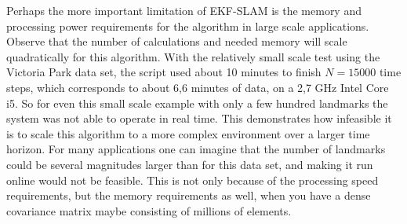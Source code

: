 Perhaps the more important limitation of EKF-SLAM is the memory and processing power requirements for the algorithm in large scale applications. Observe that the number of calculations and needed memory will scale quadratically for this algorithm. With the relatively small scale test using the Victoria Park data set, the script used about 10 minutes to finish $N=15000$ time steps, which corresponds to about 6,6 minutes of data, on a 2,7 GHz Intel Core i5. So for even this small scale example with only a few hundred landmarks the system was not able to operate in real time. This demonstrates how infeasible it is to scale this algorithm to a more complex environment over a larger time horizon. For many applications one can imagine that the number of landmarks could be several magnitudes larger than for this data set, and making it run online would not be feasible. This is not only because of the processing speed requirements, but the memory requirements as well, when you have a dense covariance matrix maybe consisting of millions of elements. 

